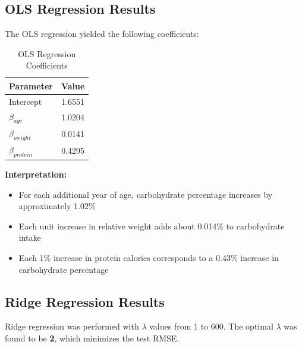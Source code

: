 \documentclass{article}
\begin{document}
\subsection{OLS Regression Results}

The OLS regression yielded the following coefficients:

\begin{table}[h]
    \centering
    \caption{OLS Regression Coefficients}
    \label{tab:ols_coef}
    \begin{tabular}{lc}
        \toprule
        \textbf{Parameter} & \textbf{Value} \\
        \midrule
        Intercept & 1.6551 \\
        $\beta_{age}$ & 1.0204 \\
        $\beta_{weight}$ & 0.0141 \\
        $\beta_{protein}$ & 0.4295 \\
        \bottomrule
    \end{tabular}
\end{table}

\textbf{Interpretation:}
\begin{itemize}
    \item For each additional year of age, carbohydrate percentage increases by approximately 1.02\%
    \item Each unit increase in relative weight adds about 0.014\% to carbohydrate intake
    \item Each 1\% increase in protein calories corresponds to a 0.43\% increase in carbohydrate percentage
\end{itemize}

\subsection{Ridge Regression Results}

Ridge regression was performed with $\lambda$ values from 1 to 600. The optimal $\lambda$ was found to be \textbf{2}, which minimizes the test RMSE.
\end{document}
